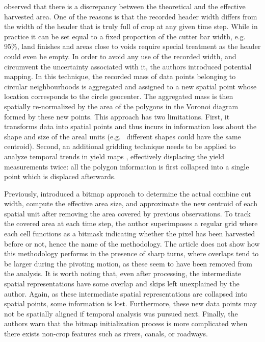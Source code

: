 \cite{Blackmore1999} observed that there is a discrepancy between the
theoretical and the effective harvested area. One of the reasons is
that the recorded header width differs from the width of the header
that is truly full of crop at any given time step. While in practice it
can be set equal to a fixed proportion of the cutter bar width,
e.g. 95\%, land finishes and areas close to voids require special
treatment as the header could even be empty. In order to avoid any use
of the recorded width, and circumvent the uncertainty associated with
it, the authors introduced potential mapping. In this technique, the
recorded mass of data points belonging to circular neighbourhoods is
aggregated and assigned to a new spatial point whose location
corresponds to the circle geocenter. The aggregated mass is then
spatially re-normalized by the area of the polygons in the Voronoi
diagram formed by these new points. This approach has two
limitations. First, it transforms data into spatial points and thus
incurs in information loss about the shape and size of the
areal units (e.g. \ different shapes could have the
same centroid). Second, an additional gridding technique needs to be
applied to analyze temporal trends in yield maps
\citep{Blackmore2003}, effectively displacing the yield measurements
twice: all the polygon information is first collapsed into a single
point which is displaced afterwards.

Previously, \cite{Han1997} introduced a bitmap approach to determine
the actual combine cut width, compute the effective area size, and
approximate the new centroid of each spatial unit after removing the
area covered by previous observations. To track the covered area at
each time step, the author superimposes a regular grid where each cell
functions as a bitmask indicating whether the pixel has been harvested
before or not, hence the name of the methodology. The article does not
show how this methodology performs in the presence of sharp turns,
where overlaps tend to be larger during the pivoting motion, as these
seem to have been removed from the analysis. It is worth noting that,
even after processing, the intermediate spatial representations have
some overlap and skips left unexplained by the author. Again, as these
intermediate spatial representations are collapsed into spatial
points, some information is lost. Furthermore, these new data points
may not be spatially aligned if temporal analysis was pursued
next. Finally, the authors warn that the bitmap initialization process
is more complicated when there exists non-crop features such as
rivers, canals, or roadways.

